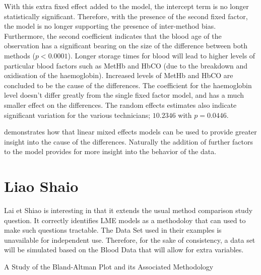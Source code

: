 \documentclass[12pt, a4paper]{report}
\theoremstyle{plain}
\theoremstyle{definition}
\theoremstyle{remark}
\begin{document}
With this extra fixed effect added to the model, the intercept
term is no longer statistically significant. Therefore, with the
presence of the second fixed factor, the model is no longer
supporting the presence of inter-method bias. Furthermore, the
second coefficient indicates that the blood age of the observation
has a significant bearing on the size of the difference between
both methods ($p <0.0001$). Longer storage times for blood will
lead to higher levels of particular blood factors such as MetHb
and HbCO (due to the breakdown and oxidisation of the
haemoglobin). Increased levels of MetHb and HbCO are concluded to
be the cause of the differences. The coefficient for the
haemoglobin level doesn't differ greatly from the single fixed
factor model, and has a much smaller effect on the differences.
The random effects estimates also indicate significant variation
for the various technicians; $10.2346$ with $p=0.0446$.

\citet{LaiShiao} demonstrates how that linear mixed effects models
can be used to provide greater insight into the cause of the
differences. Naturally the addition of further factors to the
model provides for more insight into the behavior of the data.



\newpage
\section{ Liao Shaio}

Lai et Shiao is interesting in that it extends the usual method comparison study question. It correctly identifies LME models as a methodoloy that can used to make such questions tractable.
The Data Set used in their examples is unavailable for independent use. Therefore, for the sake of consistency, a data set will be simulated based on the Blood Data that will allow for extra variables.








A Study of the Bland-Altman Plot and its Associated Methodology
\end{document}
